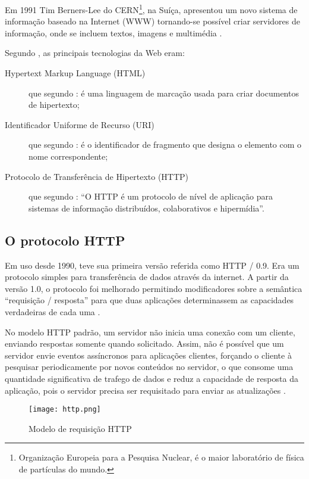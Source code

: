 Em 1991 Tim Berners-Lee do CERN\footnote{Organização Europeia para a Pesquisa Nuclear, é o maior laboratório de física de partículas do mundo.}, na Suíça, apresentou um novo sistema de informação baseado na Internet (WWW) tornando-se possível criar servidores de informação, onde se incluem textos, imagens e multimédia \cite{goethals2000historia}.

Segundo , as principais tecnologias da Web eram:
\begin{description}
	\item[Hypertext Markup Language (HTML)] que segundo : é uma linguagem de marcação usada para criar documentos de hipertexto;

	\item[Identificador Uniforme de Recurso (URI)]  que segundo : é o identificador de fragmento que designa o elemento com o nome correspondente;

	\item[Protocolo de Transferência de Hipertexto (HTTP)] que segundo : “O HTTP é um protocolo de nível de aplicação para sistemas de informação distribuídos, colaborativos e hipermídia”.
\end{description}

\subsection{O protocolo HTTP}
Em uso desde 1990, teve sua primeira versão referida como HTTP / 0.9. Era um protocolo simples para transferência de dados através da internet. A partir da versão 1.0, o protocolo foi melhorado permitindo modificadores sobre a semântica “requisição / resposta” para que duas aplicações determinassem as capacidades verdadeiras de cada uma \cite[p.~7]{Fielding1999}.

No modelo HTTP padrão, um servidor não inicia uma conexão com um cliente, enviando respostas somente quando solicitado. Assim, não é possível que um servidor envie eventos assíncronos para aplicações clientes, forçando o cliente à pesquisar periodicamente por novos conteúdos no servidor, o que consome uma quantidade significativa de trafego de dados e reduz a capacidade de resposta da aplicação, pois o servidor precisa ser requisitado para enviar as atualizações \cite{Loreto2011}.

\begin{figure}[!htb]
	\centering
	\texttt{[image: http.png]}
	\caption{Modelo de requisição HTTP}
	\label{HTTP}
\end{figure}

